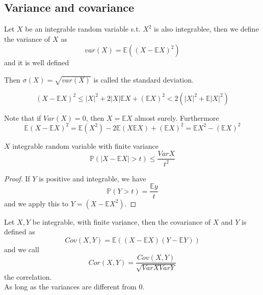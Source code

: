 \documentclass[../main.tex]{subfiles}
\begin{document}
\subsection{Variance and covariance}
\begin{defn}[Variance]
	Let $X$ be an integrable random variable s.t. $X^{2}$ is also integrablee, then we define the variance of $X$ as
	\[ 
	var( X) = \mathbb{E}( ( X- \mathbb{E}X)^{2}) 
	\]
	and it is well defined
\end{defn}
Then $\sigma( X) = \sqrt{var( X) } $ is called the standard deviation.
\begin{rmq}
\[ 
	( X- \mathbb{E}X)^{2} \leq  |X|^{2}+ 2|X| \mathbb{E}X+ ( \mathbb{E}X )^{2} < 2 ( |X|^{2}+ \mathbb{E}|X|^{2}) 
\]
\end{rmq}
Note that if $Var(X) =0$, then $X= \mathbb{E}X$ almost surely.
Furthermore
\[ 
\mathbb{E}( X- \mathbb{E}X)^{2} = \mathbb{E}( X^{2}) - 2\mathbb{E}( X\mathbb{E}X) + ( \mathbb{E}X )^{2}= \mathbb{E}X^{2}- ( \mathbb{E}X)^{2}
\]
\begin{propo}
$X$ integrable random variable with finite variance
\[ 
\mathbb{P}( |X- \mathbb{E}X|>t) \leq \frac{ Var X}{t^{2}}		
\]

\end{propo}
\begin{proof}
If $Y$ is positive and integrable, we have
\[ 
\mathbb{P}( Y>t) = \frac{\mathbb{E}y}{t}
\]
and we apply this to $Y= ( X- \mathbb{E}X^{2}) $.
\end{proof}
\begin{defn}[Covariance]
	Let $X,Y$ be integrable, with finite variance, then the covariance of $X$ and $Y$ is defined as
	\[ 
	Cov( X,Y) = \mathbb{E}(  ( X- \mathbb{E}X) ( Y- \mathbb{E}Y) ) 
	\]
	and we call 
	\[ 
	Cor( X,Y) = \frac{Cov( X,Y) }{\sqrt{ VarX VarY} }
	\]
the correlation.\\
As long as the variances are different from 0.
\end{defn}
\end{document}
